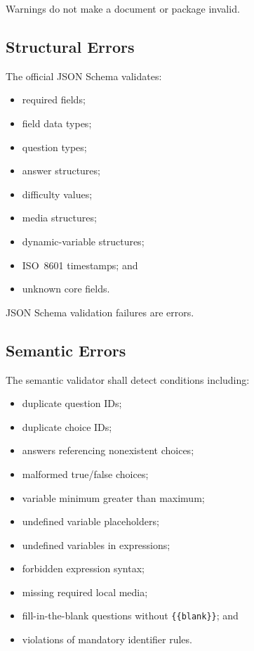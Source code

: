 \documentclass[11pt]{article}
\begin{document}
	Warnings do not make a document or package invalid.
	
	\subsection{Structural Errors}
	
	The official JSON Schema validates:
	
	\begin{itemize}
		\item required fields;
		\item field data types;
		\item question types;
		\item answer structures;
		\item difficulty values;
		\item media structures;
		\item dynamic-variable structures;
		\item ISO~8601 timestamps; and
		\item unknown core fields.
	\end{itemize}
	
	JSON Schema validation failures are errors.
	
	\subsection{Semantic Errors}
	
	The semantic validator shall detect conditions including:
	
	\begin{itemize}
		\item duplicate question IDs;
		\item duplicate choice IDs;
		\item answers referencing nonexistent choices;
		\item malformed true/false choices;
		\item variable minimum greater than maximum;
		\item undefined variable placeholders;
		\item undefined variables in expressions;
		\item forbidden expression syntax;
		\item missing required local media;
		\item fill-in-the-blank questions without \texttt{\{\{blank\}\}}; and
		\item violations of mandatory identifier rules.
	\end{itemize}
	
\end{document}
